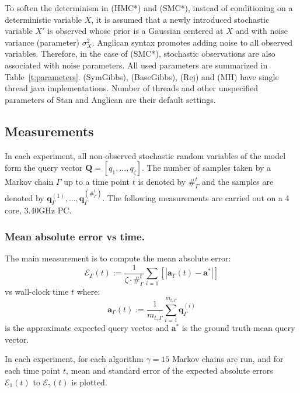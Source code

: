 \documentclass[]{article}
\newcommand{\bvec}[1]{\textbf{#1}}
\begin{document}
To soften the determinism in (HMC*) and (SMC*), 
instead of conditioning on a deterministic variable $X$, it is assumed that a newly introduced stochastic variable $X'$ is observed whose prior is a Gaussian centered at $X$ and with noise variance (parameter) $\sigma^2_{X}$.
Anglican syntax promotes adding noise to all observed variables. Therefore, in the case of (SMC*), stochastic observations are also associated with noise parameters.
All used parameters are summarized in Table~\ref{t:parameters}. 
(SymGibbs), (BaseGibbs), (Rej) and (MH) have single thread java implementations.
Number of threads and other unspecified parameters of Stan and Anglican are their default settings.    

\subsection{Measurements}
\label{sect:experimental.results.measures}
In each experiment, all non-observed stochastic random variables of the model  form the query vector $\bvec{Q} = [q_1, \ldots, q_\zeta]$.
The number of samples taken by a Markov chain $\Gamma$ up to a time point $t$ is denoted by $\#_{\Gamma}^t$ and  
the samples are denoted by 
$\bvec{q}_\Gamma^{(1)}, \ldots, \bvec{q}^{(\#_{\Gamma}^t)}_\Gamma$.
The following measurements are carried out on a 4 core, 3.40GHz PC.

\subsubsection*{Mean absolute error vs time.}
The main measurement 
is to compute the mean absolute error: 
\begin{equation}
\label{e:error.vs.time.measure}
\mathcal{E}_{\Gamma}(t) := \frac{1}{\zeta \cdot \#_\Gamma^t} \sum_{i=1}^{}[|\bvec{a}_\Gamma(t) - \bvec{a}^*|]
\end{equation}
vs wall-clock time $t$ where: 
$$\bvec{a}_\Gamma(t) := \frac{1}{m_{t, \Gamma}} \sum_{i=1}^{m_{t,\Gamma}} \bvec{q}_\Gamma^{(i)}$$ 
is the approximate expected query vector 
and $\bvec{a}^*$ is the ground truth mean query vector.

In each experiment, for each algorithm $\gamma = 15$ Markov chains are run,  and for each time point $t$,
mean and standard error of the expected absolute errors 
$\mathcal{E}_{1}(t)$ to $\mathcal{E}_{\gamma}(t)$
is plotted. 
\end{document}
